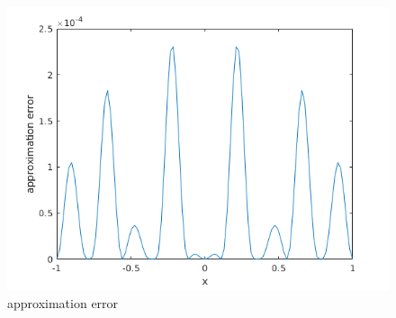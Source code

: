 \documentclass[a4paper, 11pt]{article}
\begin{document}
\begin{figure}[htbp]
\centering
	\includegraphics[scale=1.0]{figure/p2_2.png}
	\caption{approximation error}
	\label{fig2_2}
\end{figure}
\end{document}
